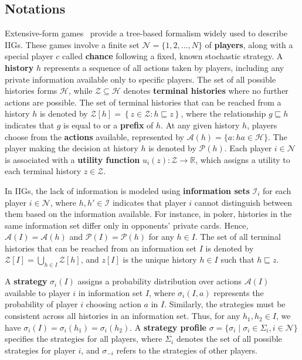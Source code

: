 \documentclass[letterpaper]{article} %
\begin{document}
\subsection{Notations}
Extensive-form games~\cite{osborne1994course} provide a tree-based formalism widely used to describe IIGs. These games involve a finite set $\mathcal{N} = \{1, 2, \ldots, N\}$ of \textbf{players}, along with a special player $c$ called \textbf{chance} following a fixed, known stochastic strategy. A \textbf{history} $h$ represents a sequence of all actions taken by players, including any private information available only to specific players. The set of all possible histories forms $\mathcal{H}$, while $\mathcal{Z} \subseteq \mathcal{H}$ denotes \textbf{terminal histories} where no further actions are possible. The set of terminal histories that can be reached from a history $h$ is denoted by $\mathcal{Z}[h] = \left\{ z \in \mathcal{Z}: h \sqsubseteq z\right\}$, where the relationship $g\sqsubseteq  h$ indicates that $g$ is equal to or a \textbf{prefix} of $h$. At any given history $h$, players choose from the \textbf{actions} available, represented by $\mathcal{A}(h) = \{a: ha \in \mathcal{H}\}$. The player making the decision at history $h$ is denoted by $\mathcal{P}(h)$. Each player $i \in \mathcal{N}$ is associated with a \textbf{utility function} $u_i(z): \mathcal{Z} \rightarrow \mathbb{R}$, which assigns a  utility to each terminal history $z \in \mathcal{Z}$. 

In IIGs, the lack of information is modeled using \textbf{information sets} $\mathcal{I}_i$ for each player $i \in \mathcal{N}$, where $h, h' \in \mathcal{I} $ indicates that player $i$ cannot distinguish between them based on the information available. For instance, in poker, histories in the same information set differ only in opponents' private cards. Hence, $\mathcal{A}(I) = \mathcal{A}(h)$ and $\mathcal{P}(I) = \mathcal{P}(h)$ for any $h \in I$. The set of all terminal histories that can be reached from an information set $I$ is denoted by $\mathcal{Z}[I] = \bigcup_{h \in I} \mathcal{Z}[h]$, and $z[I]$ is the unique history $h\in I$ such that $h\sqsubseteq z$. 

A \textbf{strategy} $\sigma_i(I)$ assigns a probability distribution over actions $\mathcal{A}(I)$ available to player $i$ in information set $I$, where $\sigma_i(I, a)$ represents the probability of player $i$ choosing action $a$ in $I$. Similarly, the strategies must be consistent across all histories in an information set. Thus, for any $h_1, h_2 \in I$, we have $\sigma_i(I) = \sigma_i(h_1) = \sigma_i(h_2)$. A \textbf{strategy profile} $\sigma = \{\sigma_i \mid \sigma_i \in \Sigma_i, i \in \mathcal{N}\}$ specifies the strategies for all players, where $\Sigma_i$ denotes the set of all possible strategies for player $i$, and $\sigma_{-i}$ refers to the strategies of other players.
\end{document}

